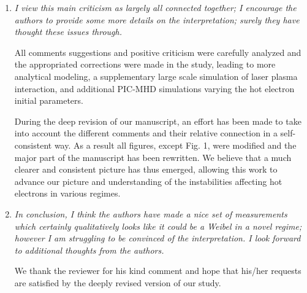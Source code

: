 \documentclass{article}
\begin{document}
\begin{enumerate}
\item \textit{
I view this main criticism as largely all connected together; I encourage the authors to provide some more details on the interpretation; surely they have thought these issues through.}

All comments suggestions and positive criticism  were carefully analyzed and the  appropriated corrections were   made in the study, leading to more analytical modeling, a supplementary large scale simulation of laser plasma interaction, and additional  PIC-MHD simulations varying the hot electron initial parameters.

During the deep revision of our manuscript, an effort has been made to take into account the different comments and their relative connection  in a self-consistent way. As a result all figures, except Fig. 1, were modified and the major part of the manuscript has been rewritten. We believe that a much clearer and consistent picture has thus emerged, allowing this work to advance our picture and understanding of the instabilities affecting hot electrons in various regimes.




\item \textit{
In conclusion, I think the authors have made a nice set of measurements which certainly qualitatively looks like it could be a Weibel in a novel regime; however I am struggling to be convinced of the interpretation. I look forward to additional thoughts from the authors.}

We thank the reviewer for his kind comment and hope that his/her requests are satisfied by the deeply revised version of our study.


\end{enumerate}
\end{document}
